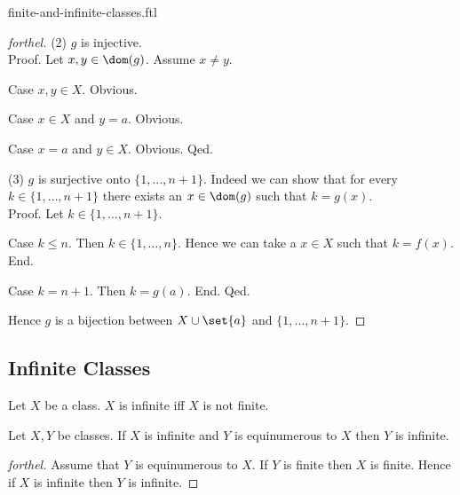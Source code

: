 \documentclass{naproche-library}
\begin{document}
\begin{smodule}{finite-and-infinite-classes.ftl}
\begin{proof}[forthel]
    (2) $g$ is injective. \\
    Proof.
      Let $x, y \in \dom(g)$.
      Assume $x \neq y$.
      
      Case $x, y \in X$. Obvious.

      Case $x \in X$ and $y = a$. Obvious.

      Case $x = a$ and $y \in X$. Obvious.
    Qed.

    (3) $g$ is surjective onto $\{ 1, \dots, n + 1 \}$.
    Indeed we can show that for every $k \in \{1, \dots, n + 1 \}$ there exists an $x \in \dom(g)$ such that $k = g(x)$. \\
    Proof.
      Let $k \in \{ 1, \dots, n + 1 \}$.

      Case $k \leq n$.
        Then $k \in \{ 1, \dots, n \}$.
        Hence we can take a $x \in X$ such that $k = f(x)$.
      End.

      Case $k = n + 1$.
        Then $k = g(a)$.
      End.
    Qed.

    Hence $g$ is a bijection between $X \cup \set{a}$ and $\{ 1, \dots, n + 1 \}$.
  \end{proof}


  \subsection*{Infinite Classes}

  \begin{definition}[forthel,id=FOUNDATIONS_14_6612510618681344]
    Let $X$ be a class.
    $X$ is infinite iff $X$ is not finite.
  \end{definition}

  \begin{proposition}[forthel,id=FOUNDATIONS_14_5814530911240192]
    Let $X, Y$ be classes.
    If $X$ is infinite and $Y$ is equinumerous to $X$ then $Y$ is infinite.
  \end{proposition}
  \begin{proof}[forthel]
    Assume that $Y$ is equinumerous to $X$.
    If $Y$ is finite then $X$ is finite.
    Hence if $X$ is infinite then $Y$ is infinite.
  \end{proof}
\end{smodule}
\end{document}
